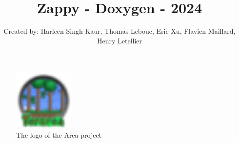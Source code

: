 \documentclass{article}
\title{Zappy - Doxygen - 2024}
\author{Created by: Harleen Singh-Kaur, Thomas Lebouc, Eric Xu, Flavien Maillard, Henry Letellier}
\date{} %
\begin{document}
\maketitle

\begin{figure}[h]
    \centering
    \includegraphics[width=3cm]{./files/icon/favicon.png}
    \caption*{The logo of the Area project}
\end{figure}
\end{document}
